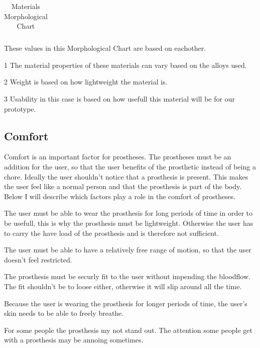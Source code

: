 \documentclass[11pt, a4paper]{article}
\begin{document}
\begin{table}[ht]
\begin{threeparttable}
\begin{tabular}[t]{>{\bfseries}l c c c c c c}
        \end{tabular}
        \caption{Materials Morphological Chart}
        \label{tab:morphchart-material}  
        \begin{tablenotes}
            \item[] These values in this Morphological Chart are based on eachother.
            \item[1] The material properties of these materials can vary based on the alloys used.
            \item[2] Weight is based on how lightweight the material is.
            \item[3] Usability in this case is based on how usefull this material will be for our prototype.  
        \end{tablenotes}    
    \end{threeparttable}   
\end{table}

\subsection{Comfort}
Comfort is an important factor for prostheses.
The prostheses must be an addition for the user, so that the user benefits of the prosthetic instead of being a chore.
Ideally the user shouldn't notice that a prosthesis is present.
This makes the user feel like a normal person and that the prosthesis is part of the body.
\\
Below I will describe which factors play a role in the comfort of prostheses.

\begin{description}[align=left]
    \item[Weight] The user must be able to wear the prosthesis for long periods of time in order to be usefull, this is why the prosthesis must be lightweight.
                  Otherwise the user has to carry the have load of the prosthesis and is therefore not sufficient.
    \item[Range of motion] The user must be able to have a relatively free range of motion, so that the user doesn't feel restricted.                       
    \item[Fit] The prosthesis must be securly fit to the user without impending the bloodflow.
               The fit shouldn't be to loose either, otherwise it will slip around all the time. 
    \item[Breathability] Because the user is wearing the prosthesis for longer periods of time, the user's skin needs to be able to freely breathe.   
    \item[Aesthetics] For some people the prosthesis my not stand out.
                      The attention some people get with a prosthesis may be annoing sometimes. 
\end{description}
\end{document}
